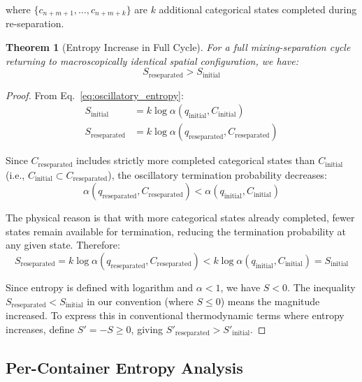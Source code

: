 \documentclass[12pt,a4paper]{article}
\newtheorem{theorem}{Theorem}[section]
\theoremstyle{remark}
\begin{document}
where $\{c_{n+m+1}, \ldots, c_{n+m+k}\}$ are $k$ additional categorical states completed during re-separation.

\begin{theorem}[Entropy Increase in Full Cycle]
\label{thm:entropy_increase}
For a full mixing-separation cycle returning to macroscopically identical spatial configuration, we have:
\begin{equation}
S_\text{reseparated} > S_\text{initial}
\end{equation}
\end{theorem}

\begin{proof}
From Eq.~\eqref{eq:oscillatory_entropy}:
\begin{align}
S_\text{initial} &= k \log \alpha(q_\text{initial}, C_\text{initial}) \\
S_\text{reseparated} &= k \log \alpha(q_\text{reseparated}, C_\text{reseparated})
\end{align}

Since $C_\text{reseparated}$ includes strictly more completed categorical states than $C_\text{initial}$ (i.e., $C_\text{initial} \subset C_\text{reseparated}$), the oscillatory termination probability decreases:
\begin{equation}
\alpha(q_\text{reseparated}, C_\text{reseparated}) < \alpha(q_\text{initial}, C_\text{initial})
\end{equation}

The physical reason is that with more categorical states already completed, fewer states remain available for termination, reducing the termination probability at any given state. Therefore:
\begin{equation}
S_\text{reseparated} = k \log \alpha(q_\text{reseparated}, C_\text{reseparated}) < k \log \alpha(q_\text{initial}, C_\text{initial}) = S_\text{initial}
\end{equation}

Since entropy is defined with logarithm and $\alpha < 1$, we have $S < 0$. The inequality $S_\text{reseparated} < S_\text{initial}$ in our convention (where $S \leq 0$) means the magnitude increased. To express this in conventional thermodynamic terms where entropy increases, define $S' = -S \geq 0$, giving $S'_\text{reseparated} > S'_\text{initial}$.
\end{proof}

\subsection{Per-Container Entropy Analysis}
\end{document}
